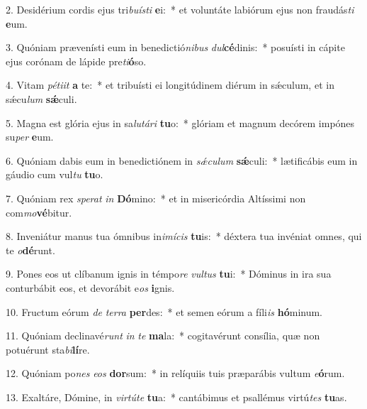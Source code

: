 2. Desidérium cordis ejus tri\textit{bu}\textit{ís}\textit{ti} \textbf{e}i:~*  et voluntáte labiórum ejus non fraudás\textit{ti} \textbf{e}um.\

3. Quóniam prævenísti eum in benedictió\textit{ni}\textit{bus} \textit{dul}\textbf{cé}dinis:~*  posuísti in cápite ejus corónam de lápide pre\textit{ti}\textbf{ó}so.\

4. Vitam \textit{pé}\textit{ti}\textit{it} \textbf{a} te:~*  et tribuísti ei longitúdinem diérum in sǽculum, et in sǽcu\textit{lum} \textbf{sǽ}culi.\

5. Magna est glória ejus in sa\textit{lu}\textit{tá}\textit{ri} \textbf{tu}o:~*  glóriam et magnum decórem impónes su\textit{per} \textbf{e}um.\

6. Quóniam dabis eum in benedictiónem in \textit{sǽ}\textit{cu}\textit{lum} \textbf{sǽ}culi:~*  lætificábis eum in gáudio cum vul\textit{tu} \textbf{tu}o.\

7. Quóniam rex \textit{spe}\textit{rat} \textit{in} \textbf{Dó}mino:~*  et in misericórdia Altíssimi non com\textit{mo}\textbf{vé}bitur.\

8. Inveniátur manus tua ómnibus in\textit{i}\textit{mí}\textit{cis} \textbf{tu}is:~*  déxtera tua invéniat omnes, qui te \textit{o}\textbf{dé}runt.\

9. Pones eos ut clíbanum ignis in témpo\textit{re} \textit{vul}\textit{tus} \textbf{tu}i:~*  Dóminus in ira sua conturbábit eos, et devorábit e\textit{os} \textbf{i}gnis.\

10. Fructum eórum \textit{de} \textit{ter}\textit{ra} \textbf{per}des:~*  et semen eórum a fíli\textit{is} \textbf{hó}minum.\

11. Quóniam declinavé\textit{runt} \textit{in} \textit{te} \textbf{ma}la:~*  cogitavérunt consília, quæ non potuérunt sta\textit{bi}\textbf{lí}re.\

12. Quóniam po\textit{nes} \textit{e}\textit{os} \textbf{dor}sum:~*  in relíquiis tuis præparábis vultum \textit{e}\textbf{ó}rum.\

13. Exaltáre, Dómine, in \textit{vir}\textit{tú}\textit{te} \textbf{tu}a:~*  cantábimus et psallémus virtú\textit{tes} \textbf{tu}as.\


